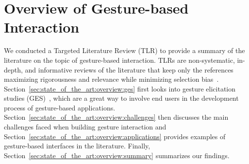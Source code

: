 \section{Overview of Gesture-based Interaction} \label{sec:state_of_the_art:overview}
We conducted a Targeted Literature Review (TLR) to provide a summary of the literature on the topic of gesture-based interaction. TLRs are non-systematic, in-depth, and informative reviews of the literature that keep only the references maximizing rigorousness and relevance while minimizing selection bias~\cite{Kysh:2013}.
%
Section~\ref{sec:state_of_the_art:overview:ges} first looks into gesture elicitation studies (GES)~\cite{Wobbrock:2009}, which are a great way to involve end users in the development process of gesture-based applications. 
Section~\ref{sec:state_of_the_art:overview:challenges} then discusses the main challenges faced when building gesture interaction and Section~\ref{sec:state_of_the_art:overview:applications} provides examples of gesture-based interfaces in the literature.
Finally, Section~\ref{sec:state_of_the_art:overview:summary} summarizes our findings.





